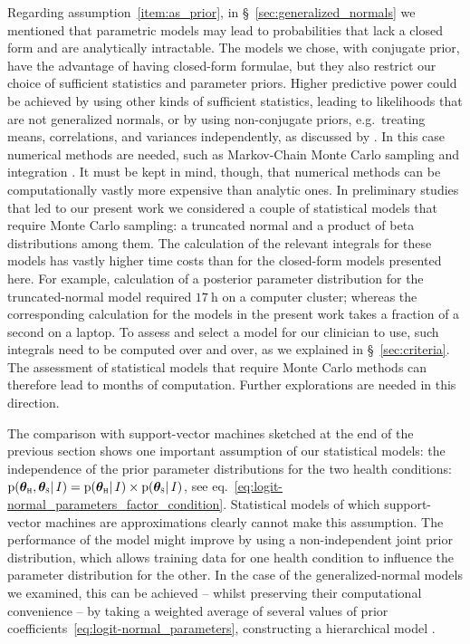 \documentclass[%
]{frontiersSCNS-nologo} %
\newcommand*{\chap}{ch.} %
\newcommand*{\chaps}{chs} %
\newcommand*{\sect}{\S} %
\newcommand*{\eqn}{eq.}
\newcommand*{\eg}{e.g.}
\newcommand*{\pf}{\mathrm{p}}%
\renewcommand*{\|}{\mathpunct{|}}%
\newcommand*{\yhu}{\textsc{h}}
\newcommand*{\yhd}{\textsc{s}}
\newcommand*{\yI}{I}
\newcommand*{\yth}{\bm{\theta}}
\newcommand*{\ythh}{\yth_{\yhu}}
\newcommand*{\yths}{\yth_{\yhd}}
\begin{document}
Regarding assumption~\ref{item:as_prior}, in
\sect~\ref{sec:generalized_normals} we mentioned that parametric models may
lead to probabilities that lack a closed form and are analytically
intractable. The models we chose, with conjugate prior, have the advantage
of having closed-form formulae, but they also restrict our choice of
sufficient statistics and parameter priors. Higher predictive power could
be achieved by using other kinds of sufficient statistics, leading to
likelihoods that are not generalized normals, or by using non-conjugate
priors, \eg\ treating means, correlations, and variances independently, as
discussed by \cite{barnardetal2000}. In this case numerical methods are
needed, such as Markov-Chain Monte Carlo sampling and integration
\citetext{\citealp[\chap~IV]{mackay1995_r2003};
  \citealp[\chaps~23--24]{murphy2012}}. It must be kept in mind, though,
that numerical methods can be computationally vastly more expensive than
analytic ones. In preliminary studies that led to our present work we
considered a couple of statistical models that require Monte Carlo
sampling: a truncated normal and a product of beta distributions among
them. The calculation of the relevant integrals for these models has vastly
higher time costs than for the closed-form models presented here. For
example, calculation of a posterior parameter distribution for the
truncated-normal model required $17\:\mathrm{h}$ on a computer cluster;
whereas the corresponding calculation for the models in the present work
takes a fraction of a second on a laptop. To assess and select a model for
our clinician to use, such integrals need to be computed over and over, as
we explained in \sect~\ref{sec:criteria}. The assessment of statistical
models that require Monte Carlo methods can therefore lead to months of
computation. Further explorations are needed in this direction.


The comparison with support-vector machines sketched at the end of the
previous section shows one important assumption of our statistical models:
the independence of the prior parameter distributions for the two health
conditions:
$\pf(\ythh, \yths \|\yI) = \pf(\ythh \|\yI) \times \pf( \yths \|\yI)$, see
\eqn~\eqref{eq:logit-normal_parameters_factor_condition}. Statistical
models of which support-vector machines are approximations clearly cannot
make this assumption. The performance of the model might improve by using a
non-independent joint prior distribution, which allows training data for
one health condition to influence the parameter distribution for the other.
In the case of the generalized-normal models we examined, this can be
achieved -- whilst preserving their computational convenience -- by taking
a weighted average of several values of prior
coefficients~\eqref{eq:logit-normal_parameters}, constructing a
hierarchical model \citep[\sect~4.6.5]{bernardoetal1994_r2000}.
\end{document}
